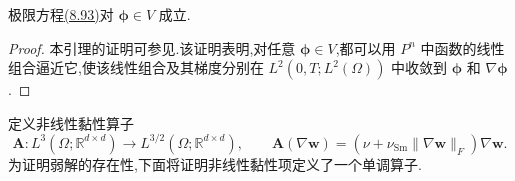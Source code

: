 \begin{lemma}[在 $V$ 中成立的极限方程]
\label{lem:smagorinsky-limiting-equation-in-v}
极限方程\hyperref[eq:smagorinsky-limiting-equation]{(8.93)}对 $\symbf{\phi}\in V$ 成立.
\begin{proof}
本引理的证明可参见\textcite[第 159 页]{Ladyzhenskaya1969}.该证明表明,对任意 $\symbf{\phi}\in V$,都可以用 $P^n$ 中函数的线性组合逼近它,使该线性组合及其梯度分别在 $L^2(0,T;L^2(\Omega))$ 中收敛到 $\symbf{\phi}$ 和 $\nabla\symbf{\phi}$.
\end{proof}
\end{lemma}

\begin{note}[非线性黏性算子]
\label{note:smagorinsky-nonlinear-viscous-operator}
定义非线性黏性算子
\begin{equation}\label{eq:smagorinsky-nonlinear-viscous-operator}
 \bm{A}:L^3(\Omega;\mathbb{R}^{d\times d})
       \longrightarrow L^{3/2}(\Omega;\mathbb{R}^{d\times d}),
 \qquad
 \bm{A}(\nabla\bm{w})
       =(\nu+\nu_{\mathrm{Sm}}\|\nabla\bm{w}\|_F)
                                    \nabla\bm{w}.
\end{equation}
为证明弱解的存在性,下面将证明非线性黏性项定义了一个单调算子.
\end{note}


